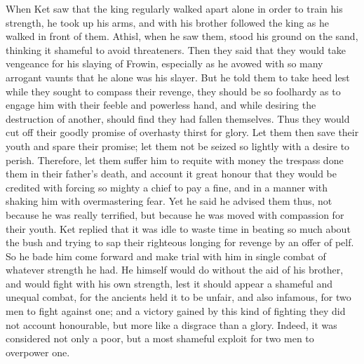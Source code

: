 \documentclass[10pt,a4paper]{report}
\begin{document}
When Ket saw that the king regularly walked apart alone in order to train his strength, he took up his arms, and with his brother followed the king as he walked in front of them. Athisl, when he saw them, stood his ground on the sand, thinking it shameful to avoid threateners. Then they said that they would take vengeance for his slaying of Frowin, especially as he avowed with so many arrogant vaunts that he alone was his slayer. But he told them to take heed lest while they sought to compass their revenge, they should be so foolhardy as to engage him with their feeble and powerless hand, and while desiring the destruction of another, should find they had fallen themselves. Thus they would cut off their goodly promise of overhasty thirst for glory. Let them then save their youth and spare their promise; let them not be seized so lightly with a desire to perish. Therefore, let them suffer him to requite with money the trespass done them in their father's death, and account it great honour that they would be credited with forcing so mighty a chief to pay a fine, and in a manner with shaking him with overmastering fear. Yet he said he advised them thus, not because he was really terrified, but because he was moved with compassion for their youth. Ket replied that it was idle to waste time in beating so much about the bush and trying to sap their righteous longing for revenge by an offer of pelf. So he bade him come forward and make trial with him in single combat of whatever strength he had. He himself would do without the aid of his brother, and would fight with his own strength, lest it should appear a shameful and unequal combat, for the ancients held it to be unfair, and also infamous, for two men to fight against one; and a victory gained by this kind of fighting they did not account honourable, but more like a disgrace than a glory. Indeed, it was considered not only a poor, but a most shameful exploit for two men to overpower one.\\
\end{document}
